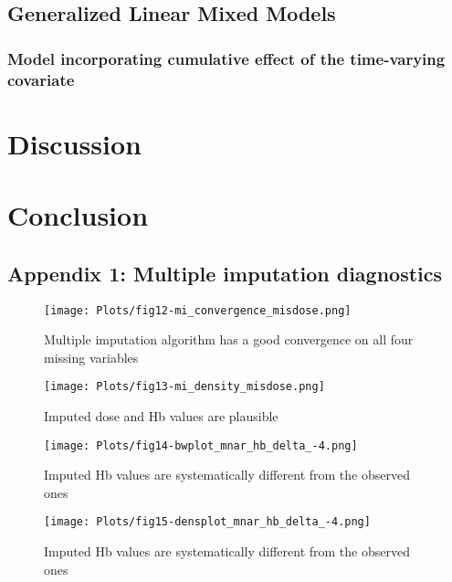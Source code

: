 \documentclass [11pt]{article}
\begin{document}
\subsection{Generalized Linear Mixed Models}


\subsubsection*{Model incorporating cumulative effect of the time-varying covariate }


\section{Discussion}\label{discussion}

\section{Conclusion}\label{conclusion}





\newpage
\begin{appendices}
\section*{Appendix 1: Multiple imputation diagnostics}
\label{sec:appendix-mi-diagnostics}

\begin{figure}[H] 
    \centering    \texttt{[image: Plots/fig12-mi\_convergence\_misdose.png]}
    \caption{Multiple imputation algorithm has a good convergence on all four missing variables}
    \label{fig:mi-mar-diag-conver}
\end{figure}

\begin{figure}[H] 
    \centering    \texttt{[image: Plots/fig13-mi\_density\_misdose.png]}
    \caption{Imputed dose and Hb values are plausible}
    \label{fig:mi-mar-diag-dens}
\end{figure}

\begin{figure}[H] 
    \centering    \texttt{[image: Plots/fig14-bwplot\_mnar\_hb\_delta\_-4.png]}
    \caption{Imputed Hb values are systematically different from the observed ones}
    \label{fig:mi-mnar-diag-box}
\end{figure}

\begin{figure}[H] 
    \centering    \texttt{[image: Plots/fig15-densplot\_mnar\_hb\_delta\_-4.png]}
    \caption{Imputed Hb values are systematically different from the observed ones}
    \label{fig:mi-mnar-diag-dens}
\end{figure}
\end{appendices}
\endpage
\clearpage
\end{document}

